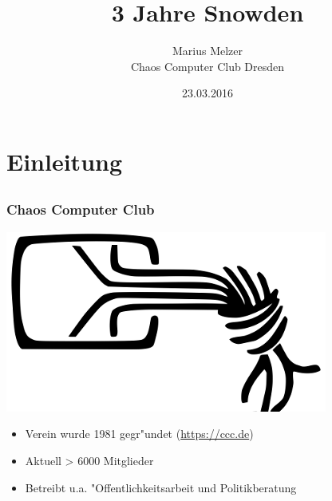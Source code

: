 \documentclass[12pt, xcolor={svgnames,table}]{beamer}
\title{3 Jahre Snowden}
\author{\small Marius Melzer\\\large Chaos Computer Club Dresden}
\date{23.03.2016}
\begin{document}
\maketitle

\section{Einleitung}
\subsection{}

\begin{frame}
    \frametitle{Chaos Computer Club}
    \begin{center}
	\includegraphics[height=0.2\textheight]{img/chaosknoten.png}
    \end{center}	
    \begin{itemize}
      \item<1-> Verein wurde 1981 gegr"undet (\url{https://ccc.de})          
      \item<2-> Aktuell > 6000 Mitglieder
      \item<3-> Betreibt u.a. "Offentlichkeitsarbeit und Politikberatung      
    \end{itemize}
\end{frame}
\end{document}
